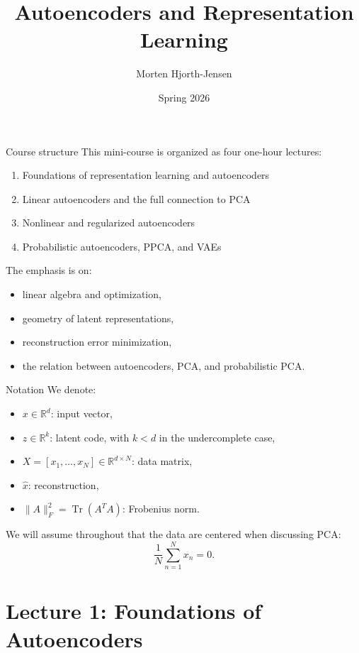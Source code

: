 \documentclass[aspectratio=169]{beamer}
\title{Autoencoders and Representation Learning}
\author{Morten Hjorth-Jensen}
\date{Spring 2026}
\begin{document}
\frame{\titlepage}

\begin{frame}{Course structure}
This mini-course is organized as four one-hour lectures:
\begin{enumerate}
\item Foundations of representation learning and autoencoders
\item Linear autoencoders and the full connection to PCA
\item Nonlinear and regularized autoencoders
\item Probabilistic autoencoders, PPCA, and VAEs
\end{enumerate}

The emphasis is on:
\begin{itemize}
\item linear algebra and optimization,
\item geometry of latent representations,
\item reconstruction error minimization,
\item the relation between autoencoders, PCA, and probabilistic PCA.
\end{itemize}
\end{frame}

\begin{frame}{Notation}
We denote:
\begin{itemize}
\item \(x \in \mathbb{R}^d\): input vector,
\item \(z \in \mathbb{R}^k\): latent code, with \(k<d\) in the undercomplete case,
\item \(X=[x_1,\dots,x_N]\in \mathbb{R}^{d\times N}\): data matrix,
\item \(\hat x\): reconstruction,
\item \(\|A\|_F^2 = \operatorname{Tr}(A^T A)\): Frobenius norm.
\end{itemize}
We will assume throughout that the data are centered when discussing PCA:
\[
\frac{1}{N}\sum_{n=1}^N x_n = 0.
\]
\end{frame}
\section{Lecture 1: Foundations of Autoencoders}
\end{document}
